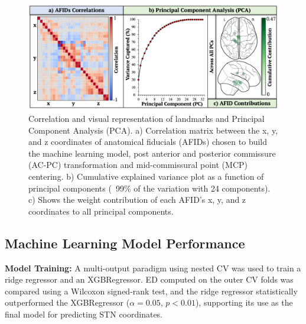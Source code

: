 \begin{figure}[hbt!]
    \centering
    \includegraphics[width=1\linewidth]{figs/ch4_Figure_PCA.png}
    \caption{Correlation and visual representation of landmarks and Principal Component Analysis (PCA). a) Correlation matrix between the x, y, and z coordinates of anatomical fiducials (AFIDs) chosen to build the machine learning model, post anterior and posterior commissure (AC-PC) transformation and mid-commissural point (MCP) centering. b) Cumulative explained variance plot as a function of principal components (~99\% of the variation with 24 components). c) Shows the weight contribution of each AFID’s x, y, and z coordinates to all principal components.}
    \label{fig:ch4_Figure_PCA}
\end{figure}

\subsection{Machine Learning Model Performance}
\textbf{Model Training:} A multi-output paradigm using nested CV was used to train a ridge regressor and an XGBRegressor. ED computed on the outer CV folds was compared using a Wilcoxon signed-rank test, and the ridge regressor statistically outperformed the XGBRegressor ($\alpha = 0.05$, $p < 0.01$), supporting its use as the final model for predicting STN coordinates.


